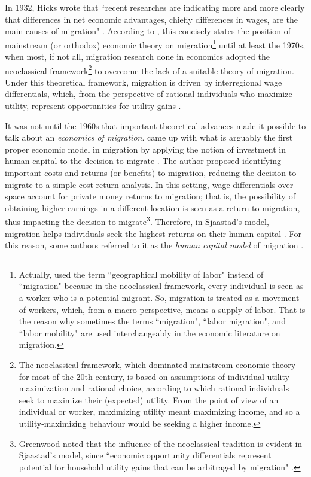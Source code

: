 In 1932, Hicks wrote that ``recent researches are indicating more and more clearly that differences in net economic advantages, chiefly differences in wages, are the main causes of migration" \citep[p. 76]{hicks_theory_1932}. According to \cite{greenwood_research_1975}, this concisely states the position of mainstream (or orthodox) economic theory on migration\footnote{Actually, \cite{greenwood_research_1975} used the term ``geographical mobility of labor" instead of ``migration" because in the neoclassical framework, every individual is seen as a worker who is a potential migrant. So, migration is treated as a movement of workers, which, from a macro perspective, means a supply of labor. That is the reason why sometimes the terms ``migration", ``labor migration", and ``labor mobility" are used interchangeably in the economic literature on migration.} until at least the 1970s, when most, if not all, migration research done in economics adopted the neoclassical framework\footnote{The neoclassical framework, which dominated mainstream economic theory for most of the 20th century, is based on assumptions of individual utility maximization and rational choice, according to which rational individuals seek to maximize their (expected) utility. From the point of view of an individual or worker, maximizing utility meant maximizing income, and so a utility-maximizing behaviour would be seeking a higher income.} to overcome the lack of a suitable theory of migration. Under this theoretical framework, migration is driven by interregional wage differentials, which, from the perspective of rational individuals who maximize utility, represent opportunities for utility gains \citep{greenwood_research_1975, lucas_internal_1997, greenwood_internal_1997}.

It was not until the 1960s that important theoretical advances made it possible to talk about an \textit{economics of migration}. \cite{sjaastad_costs_1962} came up with what is arguably the first proper economic model in migration by applying the notion of investment in human capital to the decision to migrate \citep{greenwood_internal_1997}. The author proposed identifying important costs and returns (or benefits) to migration, reducing the decision to migrate to a simple cost-return analysis. In this setting, wage differentials over space account for private money returns to migration; that is, the possibility of obtaining higher earnings in a different location is seen as a return to migration, thus impacting the decision to migrate\footnote{Greenwood noted that the influence of the neoclassical tradition is evident in Sjaastad's model, since ``economic opportunity differentials represent potential for household utility gains that can be arbitraged by migration" \citep[p. 670]{greenwood_internal_1997}.}. Therefore, in Sjaastad's model, migration helps individuals seek the highest returns on their human capital \citep{sjaastad_costs_1962}. For this reason, some authors referred to it as the \textit{human capital model} of migration \citep{shields_emergence_1989, greenwood_internal_1997}.

